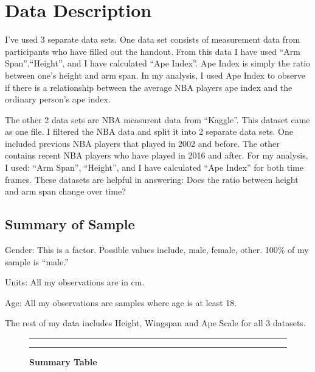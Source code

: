 \documentclass[]{article}
\begin{document}
\section{Data Description}
\label{sec:data}

I've used 3 separate data sets. One data set consists of measurement
data from participants who have filled out the handout. From this data I
have used ``Arm Span'',``Height'', and I have calculated ``Ape Index''.
Ape Index is simply the ratio between one's height and arm span. In my
analysis, I used Ape Index to observe if there is a relationship between
the average NBA players ape index and the ordinary person's ape index.
\newline \newline

\noindent The other 2 data sets are NBA measurent data from ``Kaggle''.
This dataset came as one file. I filtered the NBA data and split it into
2 separate data sets. One included previous NBA players that played in
2002 and before. The other contains recent NBA players who have played
in 2016 and after. For my analysis, I used: ``Arm Span'', ``Height'',
and I have calculated ``Ape Index'' for both time frames. These datasets
are helpful in answering: Does the ratio between height and arm span
change over time? \newpage

\subsection{Summary of Sample}
\label{sec:data-sample}

Gender: This is a factor. Possible values include, male, female, other.
100\% of my sample is ``male.''\vspace{2.5mm}

\noindent Units: All my observations are in cm.

\noindent Age: All my observations are samples where age is at least 18.

\noindent The rest of my data includes Height, Wingspan and Ape Scale
for all 3 datasets. \vspace{2.5mm} \label{sec:Summary of Sample}

\begin{figure}[!ht]
    \hrule
    \caption{ \textbf{Summary Table} }
    \begin{center}
    \end{center}
    \label{fig:handout-1}
    \hrule
\end{figure}
\end{document}
